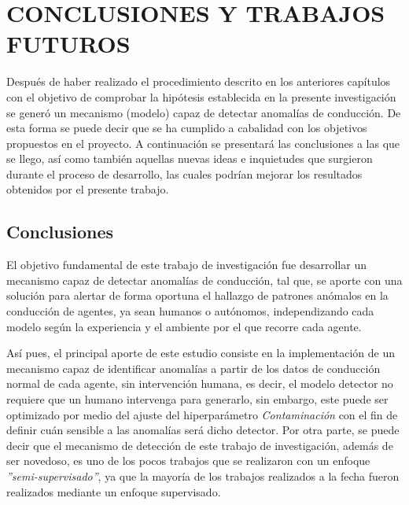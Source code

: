 \chapter{\uppercase{Conclusiones y trabajos futuros}}
\label{Capitulo 7}

Despu\'{e}s de haber realizado el procedimiento descrito en los anteriores cap\'{i}tulos con el objetivo de comprobar la hip\'{o}tesis establecida en la presente investigaci\'{o}n se gener\'{o} un mecanismo (modelo) capaz de detectar anomal\'{i}as de conducci\'{o}n. De esta forma se puede decir que se ha cumplido a cabalidad con los objetivos propuestos en el proyecto. A continuaci\'{o}n se presentar\'{a} las conclusiones a las que se llego, as\'{i} como tambi\'{e}n aquellas nuevas ideas e inquietudes que surgieron durante el proceso de desarrollo, las cuales podr\'{i}an mejorar los resultados obtenidos por el presente trabajo.

\section{Conclusiones}

El objetivo fundamental de este trabajo de investigaci\'{o}n fue desarrollar un mecanismo capaz de detectar anomal\'{i}as de conducci\'{o}n, tal que, se aporte con una soluci\'{o}n para alertar de forma oportuna el hallazgo de patrones an\'{o}malos en la conducci\'{o}n de agentes, ya sean humanos o aut\'{o}nomos, independizando cada modelo seg\'{u}n la experiencia y el ambiente por el que recorre cada agente.

\vspace{5mm} %

As\'{i} pues, el principal aporte de este estudio consiste en la implementaci\'{o}n de un mecanismo capaz de identificar anomal\'{i}as a partir de los datos de conducci\'{o}n normal de cada agente, sin intervenci\'{o}n humana, es decir, el modelo detector no requiere que un humano intervenga para generarlo, sin embargo, este puede ser optimizado por medio del ajuste del hiperpar\'{a}metro \textit{Contaminaci\'{o}n} con el fin de definir cu\'{a}n sensible a las anomal\'{i}as ser\'{a} dicho detector. Por otra parte, se puede decir que el mecanismo de detecci\'{o}n de este trabajo de investigaci\'{o}n, adem\'{a}s de ser novedoso, es uno de los pocos trabajos que se realizaron con un enfoque \textit{''semi-supervisado''}, ya que la mayor\'{i}a de los trabajos realizados a la fecha fueron realizados mediante un enfoque supervisado.

